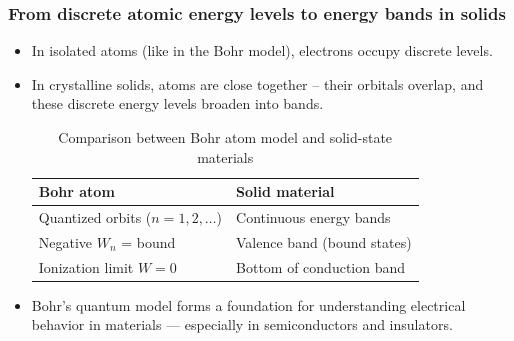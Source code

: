 \begin{frame}
	\frametitle{From discrete atomic energy levels to energy bands in solids}
    \begin{itemize}
        \item In isolated atoms (like in the Bohr model), electrons occupy discrete levels.
        \item In crystalline solids, atoms are close together -- their orbitals overlap, and these discrete energy levels broaden into bands.
    \begin{table}[h!]
        \centering
        \begin{tabular}{|l|l|}
        \hline
        \textbf{Bohr atom} & \textbf{Solid material} \\
        \hline
        Quantized orbits ($n = 1,2,\ldots$) & Continuous energy bands \\
        \hline
        Negative $W_n$ = bound & Valence band (bound states) \\
        \hline
        Ionization limit $W = 0$ & Bottom of conduction band \\
        \hline
        \end{tabular}
        \caption{Comparison between Bohr atom model and solid-state materials}
        \end{table}
        \item Bohr's quantum model forms a foundation for understanding electrical behavior in materials — especially in semiconductors and insulators.
    \end{itemize}
\end{frame}

